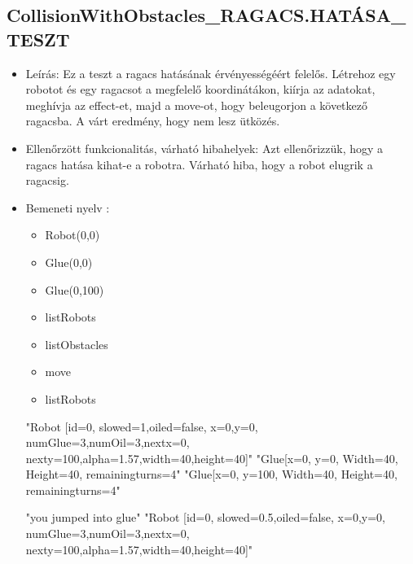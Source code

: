 \subsection{CollisionWithObstacles\_RAGACS.HATÁSA\_TESZT}
\begin{itemize}
	\item Leírás: Ez a teszt a ragacs hatásának érvényességéért felelős. Létrehoz egy robotot és egy ragacsot a megfelelő koordinátákon, kiírja az adatokat, meghívja az effect-et, majd a move-ot, hogy beleugorjon a következő ragacsba. A várt eredmény, hogy nem lesz ütközés.
\newline
	\item  Ellenőrzött funkcionalitás, várható hibahelyek: Azt ellenőrizzük, hogy a ragacs hatása kihat-e a robotra.
		   Várható hiba, hogy a robot elugrik a ragacsig.
	\item Bemeneti nyelv :
		\begin{itemize}
		\item Robot(0,0)
		\item Glue(0,0)
		\item Glue(0,100)
		\item listRobots
		\item listObstacles
		\item move
		\item listRobots
		\end{itemize}
	
		"Robot [id=0,  slowed=1,oiled=false, x=0,y=0, 
		\\numGlue=3,numOil=3,nextx=0,
		\\nexty=100,alpha=1.57,width=40,height=40]"\newline
		"Glue[x=0, y=0, Width=40, Height=40, remainingturns=4"\newline
			"Glue[x=0, y=100, Width=40, Height=40, remainingturns=4"\newline
			
			"you jumped into glue"\newline
				"Robot [id=0,  slowed=0.5,oiled=false, x=0,y=0, 
		\\numGlue=3,numOil=3,nextx=0,
		\\nexty=100,alpha=1.57,width=40,height=40]"\newline
		
\end{itemize}


